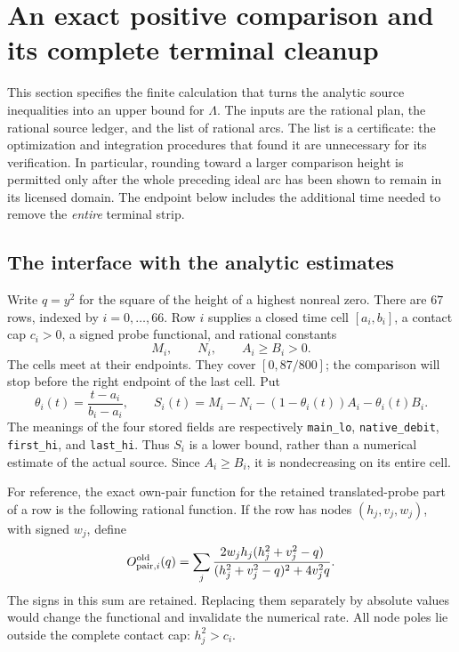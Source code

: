 \documentclass[11pt,a4paper]{article}
\theoremstyle{definition}
\theoremstyle{remark}
\newcommand{\Lam}{\Lambda}
\begin{document}


\section{An exact positive comparison and its complete terminal cleanup}
\label{flow:section}

This section specifies the finite calculation that turns the analytic
source inequalities into an upper bound for $\Lam$.  The inputs are the
rational plan, the rational source ledger, and the list of rational arcs.
The list is a certificate: the optimization and integration procedures
that found it are unnecessary for its verification.  In particular,
rounding toward a larger comparison height is permitted only after the
whole preceding ideal arc has been shown to remain in its licensed domain.
The endpoint below includes the additional time needed to remove the
\emph{entire} terminal strip.

\subsection{The interface with the analytic estimates}
\label{flow:interface}

Write $q=y^2$ for the square of the height of a highest nonreal zero.
There are $67$ rows, indexed by $i=0,\ldots,66$.  Row $i$ supplies a
closed time cell $[a_i,b_i]$, a contact cap $c_i>0$, a signed probe
functional, and rational constants
\[
 M_i,\qquad N_i,\qquad A_i\geq B_i>0.
\]
The cells meet at their endpoints.  They cover $[0,87/800]$; the
comparison will stop before the right endpoint of the last cell.  Put
\begin{equation}
 \theta_i(t)=\frac{t-a_i}{b_i-a_i},\qquad
 S_i(t)=M_i-N_i-(1-\theta_i(t))A_i-\theta_i(t)B_i.
 \label{flow:source-affine}
\end{equation}
The meanings of the four stored fields are respectively
\texttt{main\_lo}, \texttt{native\_debit}, \texttt{first\_hi}, and
\texttt{last\_hi}.  Thus $S_i$ is a lower bound, rather than a numerical
estimate of the actual source.  Since $A_i\geq B_i$, it is nondecreasing
on its entire cell.

For reference, the exact own-pair function for the retained translated-probe
part of a row is the following rational function.  If the row has nodes
$(h_j,v_j,w_j)$, with signed $w_j$, define
\begin{equation}
 O_{\mathrm{pair},i}^{\rm old}(q)=
 \sum_j\frac{2w_jh_j(h_j^2+v_j^2-q)}
 {(h_j^2+v_j^2-q)^2+4v_j^2q}.
 \label{flow:old-own}
\end{equation}
The signs in this sum are retained.  Replacing them separately by absolute
values would change the functional and invalidate the numerical rate.
All node poles lie outside the complete contact cap: $h_j^2>c_i$.
\end{document}
